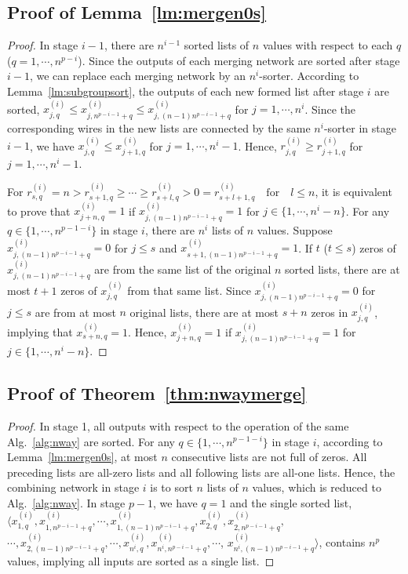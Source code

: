 \documentclass[10pt,journal,cspaper,compsoc]{IEEEtran}
\begin{document}
\subsection{Proof of Lemma~\ref{lm:mergen0s}}
\label{pf:mergen0s}
\begin{proof}
  In stage $i-1$, there are $n^{i-1}$ sorted lists of $n$ values with respect to each $q$ ($q=1,\cdots,n^{p-i}$).
  Since the outputs of each merging network are sorted after stage $i-1$, we can replace each merging network by an $n^i$-sorter.
  According to Lemma~\ref{lm:subgroupsort}, the outputs of each new formed list after stage $i$ are sorted, $x^{(i)}_{j,q} \le x^{(i)}_{j,n^{p-i-1} + q} \le x^{(i)}_{j,(n-1)n^{p-i-1} + q}$ for $j=1,\cdots,n^i$.
  Since the corresponding wires in the new lists are connected by the same $n^i$-sorter in stage $i-1$, we have $x^{(i)}_{j,q} \le x^{(i)}_{j+1,q}$ for $j=1,\cdots, n^i-1$. Hence, $r^{(i)}_{j,q} \ge r^{(i)}_{j+1,q}$ for $j=1,\cdots, n^i-1$.

  For $r^{(i)}_{s,q} = n > r^{(i)}_{s+1,q} \ge \cdots \ge r^{(i)}_{s+l,q} > 0 = r^{(i)}_{s+l+1,q} \quad \mbox{for} \quad l \le n$, it is equivalent to prove that $x^{(i)}_{j+n,q} = 1$ if $x^{(i)}_{j,(n-1)n^{p-i-1}+q} = 1$ for $j\in \{1,\cdots,n^i-n\}$.
  For any $q \in \{1,\cdots, n^{p-1-i}\}$ in stage $i$, there are $n^i$ lists of $n$ values. Suppose $x^{(i)}_{j,(n-1)n^{p-i-1}+q} = 0$ for $j\le s$ and $x^{(i)}_{s+1,(n-1)n^{p-i-1}+q} = 1$.
  If $t$ ($t\le s$) zeros of $x^{(i)}_{j,(n-1)n^{p-i-1}+q}$ are from the same list of the original $n$ sorted lists, there are at most $t+1$ zeros of $x^{(i)}_{j,q}$ from that same list. Since $x^{(i)}_{j,(n-1)n^{p-i-1}+q}=0$ for $j\le s$ are from at most $n$ original lists, there are at most $s+n$ zeros in $x^{(i)}_{j,q}$, implying that $x^{(i)}_{s+n,q}=1$.
  Hence, $x^{(i)}_{j+n,q} = 1$ if $x^{(i)}_{j,(n-1)n^{p-i-1}+q} = 1$ for $j\in \{1,\cdots,n^i-n\}$.
\end{proof}

\subsection{Proof of Theorem~\ref{thm:nwaymerge}}
\label{pf:nwaymerge}
\begin{proof}
  In stage 1, all outputs with respect to the operation of the same Alg.~\ref{alg:nway} are sorted.
  For any $q\in \{1,\cdots, n^{p-1-i} \}$ in stage $i$, according to Lemma~\ref{lm:mergen0s}, at most $n$ consecutive lists are not full of zeros. All preceding lists are all-zero lists and all following lists are all-one lists.
  Hence, the combining network in stage $i$ is to sort $n$ lists of $n$ values, which is reduced to Alg.~\ref{alg:nway}. In stage $p-1$, we have $q=1$ and the single sorted list, $\langle x^{(i)}_{1,q}, x^{(i)}_{1,n^{p-i-1} + q}, \cdots, x^{(i)}_{1,(n-1)n^{p-i-1} + q}, x^{(i)}_{2,q}, x^{(i)}_{2,n^{p-i-1} + q},$ $\cdots, x^{(i)}_{2,(n-1)n^{p-i-1} + q}, \cdots, x^{(i)}_{n^i,q}, x^{(i)}_{n^i,n^{p-i-1} + q}, \cdots$, $x^{(i)}_{n^i,(n-1)n^{p-i-1} + q} \rangle$, contains $n^p$ values, implying all inputs are sorted as a single list.
\end{proof}




\end{document}
